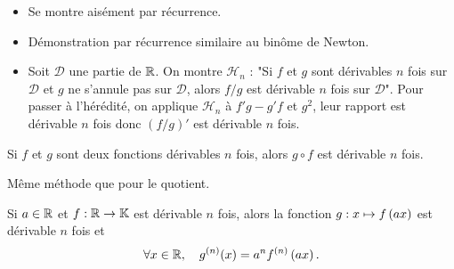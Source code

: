 \documentclass{magnoliaold}
\begin{document}
\begin{preuve}
\begin{itemize}
\item Se montre aisément par récurrence.
\item Démonstration par récurrence similaire au binôme de Newton.
\item Soit $\mathcal{D}$ une partie de $\mathbb{R}$. On montre $\mathcal{H}_n$ : "Si $f$ et $g$ sont dérivables $n$ fois sur $\mathcal{D}$ et $g$ ne s'annule pas sur $\mathcal{D}$, alors $f/g$ est dérivable $n$ fois sur $\mathcal{D}$".
Pour passer à l'hérédité, on applique $\mathcal{H}_n$ à $f'g-g'f$ et $g^2$, leur rapport est dérivable $n$ fois donc $(f/g)'$ est dérivable $n$ fois.
\end{itemize}

\end{preuve}

\begin{proposition}[utile=-3]
Si $f$ et $g$ sont deux fonctions dérivables $n$ fois, alors $g\circ f$ est
dérivable $n$ fois.  
\end{proposition}

\begin{preuve}
Même méthode que pour le quotient.
\end{preuve}

\begin{remarqueUnique}
\remarque Si $a\in\mathbb{R}$ et $f:\mathbb{R}\to\mathbb{K}$ est dérivable $n$ fois, alors la fonction $g:x\mapsto f\left(ax\right)$
  est dérivable $n$ fois et
  \[\forall x\in\mathbb{R} ,\quad g^{(n)}(x)=a^n f^{(n)}\left(ax\right).\]
\end{remarqueUnique}
\end{document}
